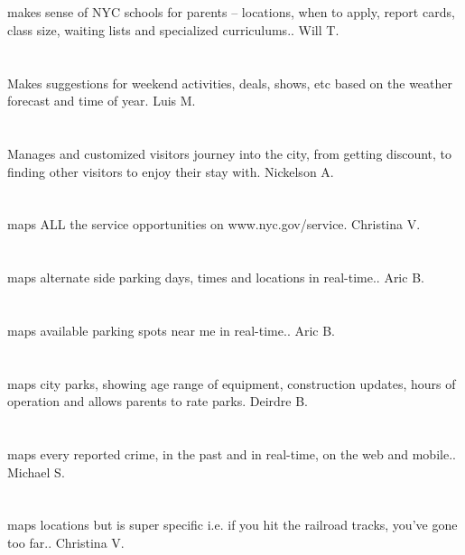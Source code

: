 \section{}makes sense of NYC schools for parents -- locations,  when to apply,  report cards,  class size,  waiting lists and specialized curriculums.. Will T.
\section{}Makes suggestions for weekend activities,  deals,  shows,  etc based on the weather forecast and time of year. Luis M.
\section{}Manages and customized visitors journey into the city, from getting discount,  to finding other visitors to enjoy their stay with. Nickelson A.
\section{}maps ALL the service opportunities on www.nyc.gov/service. Christina  V.
\section{}maps alternate side parking days,  times and locations in real-time.. Aric B.
\section{}maps available parking spots near me in real-time.. Aric B.
\section{}maps city parks,  showing age range of equipment,  construction updates,  hours of operation and allows parents to rate parks. Deirdre B.
\section{}maps every reported crime,  in the past and in real-time,  on the web and mobile.. Michael S.
\section{}maps locations but is super specific i.e. if you hit the railroad tracks,  you've gone too far.. Christina  V.
